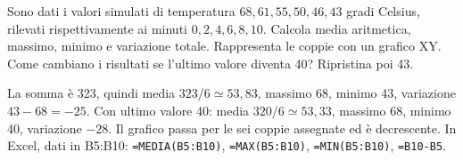 
\begin{esercizio}
Sono dati i valori simulati di temperatura $68,61,55,50,46,43$ gradi Celsius,
rilevati rispettivamente ai minuti $0,2,4,6,8,10$.
Calcola media aritmetica, massimo, minimo e variazione totale. Rappresenta le coppie con un grafico XY.
Come cambiano i risultati se l'ultimo valore diventa 40? Ripristina poi 43.
\end{esercizio}

\begin{soluzione}
La somma è 323, quindi media $323/6\simeq53{,}83$, massimo 68, minimo 43,
variazione $43-68=-25$. Con ultimo valore 40: media $320/6\simeq53{,}33$,
massimo 68, minimo 40, variazione $-28$. Il grafico passa per le sei coppie assegnate
ed è decrescente. In Excel, dati in B5:B10: \texttt{=MEDIA(B5:B10)},
\texttt{=MAX(B5:B10)}, \texttt{=MIN(B5:B10)}, \texttt{=B10-B5}.
\end{soluzione}

